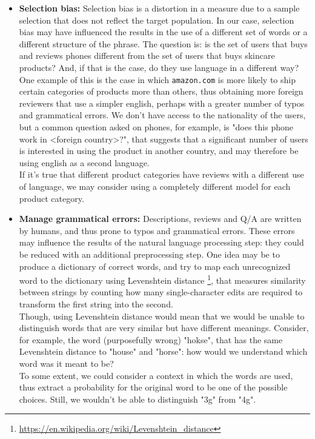 \documentclass[LaM,oneside,binding=0.6cm]{sapthesis}
\begin{document}
\begin{itemize}
	\item \textbf{Selection bias: } Selection bias is a distortion in a measure due to a sample selection that does not reflect the target population. In our case, selection bias may have influenced the results in the use of a different set of words or a different structure of the phrase. The question is: is the set of users that buys and reviews phones different from the set of users that buys skincare products? And, if that is the case, do they use language in a different way? \\
	One example of this is the case in which \texttt{amazon.com} is more likely to ship certain categories of products more than others, thus obtaining more foreign reviewers that use a simpler english, perhaps with a greater number of typos and grammatical errors. We don't have access to the nationality of the users, but a common question asked on phones, for example, is "does this phone work in <foreign country>?", that suggests that a significant number of users is interested in using the product in another country, and may therefore be using english as a second language. \\
	If it's true that different product categories have reviews with a different use of language, we may consider using a completely different model for each product category.
	\item \textbf{Manage grammatical errors: } Descriptions, reviews and Q/A are written by humans, and thus prone to typos and grammatical errors. These errors may influence the results of the natural language processing step: they could be reduced with an additional preprocessing step. One idea may be to produce a dictionary of correct words, and try to map each unrecognized word to the dictionary using Levenshtein distance \footnote{\url{https://en.wikipedia.org/wiki/Levenshtein_distance}}, that measures similarity between strings by counting how many single-character edits are required to transform the first string into the second. \\
	Though, using Levenshtein distance would mean that we would be unable to distinguish words that are very similar but have different meanings. Consider, for example, the word (purposefully wrong) "hokse", that has the same Levenshtein distance to "house" and "horse": how would we understand which word was it meant to be? \\
	To some extent, we could consider a context in which the words are used, thus extract a probability for the original word to be one of the possible choices. Still, we wouldn't be able to distinguish "3g" from "4g".

\end{itemize}
\end{document}
